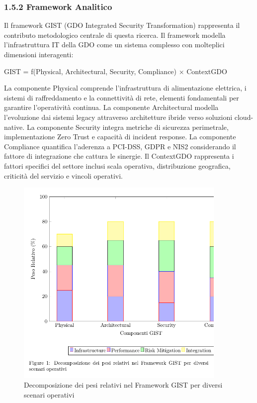 \documentclass{report}
\begin{document}
\subsubsection{\texorpdfstring{\textbf{1.5.2 Framework
Analitico}}{1.5.2 Framework Analitico}}\label{framework-analitico}

Il framework GIST (GDO Integrated Security Transformation) rappresenta
il contributo metodologico centrale di questa ricerca. Il framework
modella l'infrastruttura IT della GDO come un sistema complesso con
molteplici dimensioni interagenti:

GIST = f(Physical, Architectural, Security, Compliance) × ContextGDO

La componente Physical comprende l'infrastruttura di alimentazione
elettrica, i sistemi di raffreddamento e la connettività di rete,
elementi fondamentali per garantire l'operatività continua. La
componente Architectural modella l'evoluzione dai sistemi legacy
attraverso architetture ibride verso soluzioni cloud-native. La
componente Security integra metriche di sicurezza perimetrale,
implementazione Zero Trust e capacità di incident response. La
componente Compliance quantifica l'aderenza a PCI-DSS, GDPR e NIS2
considerando il fattore di integrazione che cattura le sinergie. Il
ContextGDO rappresenta i fattori specifici del settore inclusi scala
operativa, distribuzione geografica, criticità del servizio e vincoli
operativi.
\begin{figure}[htbp]
    \centering
    \includegraphics[width=0.9\textwidth]{figura 1-3}
\caption{Decomposizione dei pesi relativi nel Framework GIST per diversi scenari operativi}
\label{fig:gist_decomposition}
\end{figure}
\end{document}
